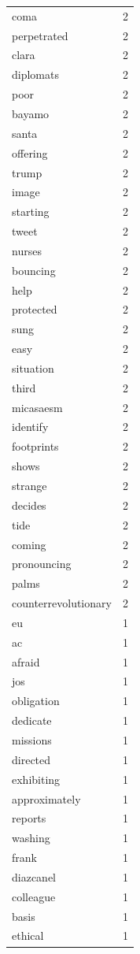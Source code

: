 \begin{tabular}{lr}
coma & 2 \\
perpetrated & 2 \\
clara & 2 \\
diplomats & 2 \\
poor & 2 \\
bayamo & 2 \\
santa & 2 \\
offering & 2 \\
trump & 2 \\
image & 2 \\
starting & 2 \\
tweet & 2 \\
nurses & 2 \\
bouncing & 2 \\
help & 2 \\
protected & 2 \\
sung & 2 \\
easy & 2 \\
situation & 2 \\
third & 2 \\
micasaesm & 2 \\
identify & 2 \\
footprints & 2 \\
shows & 2 \\
strange & 2 \\
decides & 2 \\
tide & 2 \\
coming & 2 \\
pronouncing & 2 \\
palms & 2 \\
counterrevolutionary & 2 \\
eu & 1 \\
ac & 1 \\
afraid & 1 \\
jos & 1 \\
obligation & 1 \\
dedicate & 1 \\
missions & 1 \\
directed & 1 \\
exhibiting & 1 \\
approximately & 1 \\
reports & 1 \\
washing & 1 \\
frank & 1 \\
diazcanel & 1 \\
colleague & 1 \\
basis & 1 \\
ethical & 1 \\

\end{tabular}
